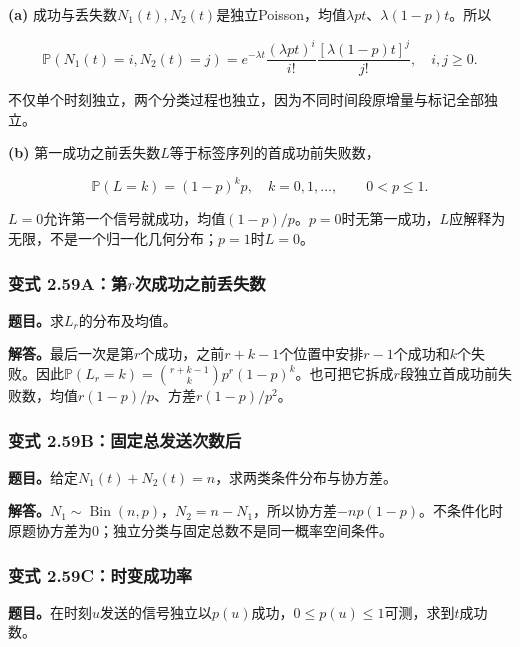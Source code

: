 \documentclass[12pt,a4paper,UTF8,fontset=fandol]{ctexart}
\begin{document}
\textbf{(a)}
成功与丢失数\(N_1(t),N_2(t)\)是独立Poisson，均值\(\lambda pt\)、\(\lambda(1-p)t\)。所以

\[\boxed{\mathbb P(N_1(t)=i,N_2(t)=j)
=e^{-\lambda t}\frac{(\lambda pt)^i}{i!}
\frac{[\lambda(1-p)t]^j}{j!},\quad i,j\ge0.}\]

不仅单个时刻独立，两个分类过程也独立，因为不同时间段原增量与标记全部独立。

\textbf{(b)} 第一成功之前丢失数\(L\)等于标签序列的首成功前失败数，

\[\boxed{\mathbb P(L=k)=(1-p)^kp,\quad k=0,1,\ldots,\qquad0<p\le1.}\]

\(L=0\)允许第一个信号就成功，均值\((1-p)/p\)。\(p=0\)时无第一成功，\(L\)应解释为无限，不是一个归一化几何分布；\(p=1\)时\(L=0\)。

\subsubsection{\texorpdfstring{变式
2.59A：第\(r\)次成功之前丢失数}{变式 2.59A：第r次成功之前丢失数}}\label{ux53d8ux5f0f-2.59aux7b2crux6b21ux6210ux529fux4e4bux524dux4e22ux5931ux6570}

\textbf{题目。}求\(L_r\)的分布及均值。

\textbf{解答。}最后一次是第\(r\)个成功，之前\(r+k-1\)个位置中安排\(r-1\)个成功和\(k\)个失败。因此\(\mathbb P(L_r=k)=\binom{r+k-1}{k}p^r(1-p)^k\)。也可把它拆成\(r\)段独立首成功前失败数，均值\(r(1-p)/p\)、方差\(r(1-p)/p^2\)。

\subsubsection{变式
2.59B：固定总发送次数后}\label{ux53d8ux5f0f-2.59bux56faux5b9aux603bux53d1ux9001ux6b21ux6570ux540e}

\textbf{题目。}给定\(N_1(t)+N_2(t)=n\)，求两类条件分布与协方差。

\textbf{解答。}\(N_1\sim\operatorname{Bin}(n,p)\)，\(N_2=n-N_1\)，所以协方差\(-np(1-p)\)。不条件化时原题协方差为0；独立分类与固定总数不是同一概率空间条件。

\subsubsection{变式
2.59C：时变成功率}\label{ux53d8ux5f0f-2.59cux65f6ux53d8ux6210ux529fux7387}

\textbf{题目。}在时刻\(u\)发送的信号独立以\(p(u)\)成功，\(0\le p(u)\le1\)可测，求到\(t\)成功数。
\end{document}

